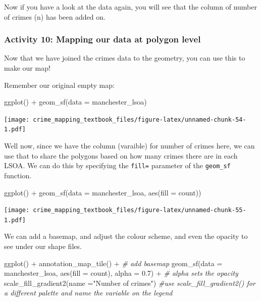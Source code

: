 \documentclass[
]{book}
\newenvironment{Shaded}{\begin{snugshade}}{\end{snugshade}}
\newcommand{\AttributeTok}[1]{\textcolor[rgb]{0.77,0.63,0.00}{#1}}
\newcommand{\CommentTok}[1]{\textcolor[rgb]{0.56,0.35,0.01}{\textit{#1}}}
\newcommand{\FloatTok}[1]{\textcolor[rgb]{0.00,0.00,0.81}{#1}}
\newcommand{\FunctionTok}[1]{\textcolor[rgb]{0.00,0.00,0.00}{#1}}
\newcommand{\NormalTok}[1]{#1}
\newcommand{\SpecialCharTok}[1]{\textcolor[rgb]{0.00,0.00,0.00}{#1}}
\newcommand{\StringTok}[1]{\textcolor[rgb]{0.31,0.60,0.02}{#1}}
\begin{document}
Now if you have a look at the data again, you will see that the column of number of crimes (n) has been added on.

\hypertarget{activity-10-mapping-our-data-at-polygon-level}{%
\subsubsection{Activity 10: Mapping our data at polygon level}\label{activity-10-mapping-our-data-at-polygon-level}}

Now that we have joined the crimes data to the geometry, you can use this to make our map!

Remember our original empty map:

\begin{Shaded}
\begin{Highlighting}[]
\FunctionTok{ggplot}\NormalTok{() }\SpecialCharTok{+} 
\FunctionTok{geom\_sf}\NormalTok{(}\AttributeTok{data =}\NormalTok{ manchester\_lsoa)}
\end{Highlighting}
\end{Shaded}

\texttt{[image: crime\_mapping\_textbook\_files/figure-latex/unnamed-chunk-54-1.pdf]}

Well now, since we have the column (varaible) for number of crimes here, we can use that to share the polygons based on how many crimes there are in each LSOA. We can do this by specifying the \texttt{fill=} parameter of the \texttt{geom\_sf} function.

\begin{Shaded}
\begin{Highlighting}[]
\FunctionTok{ggplot}\NormalTok{() }\SpecialCharTok{+} 
\FunctionTok{geom\_sf}\NormalTok{(}\AttributeTok{data =}\NormalTok{ manchester\_lsoa, }\FunctionTok{aes}\NormalTok{(}\AttributeTok{fill =}\NormalTok{ count))}
\end{Highlighting}
\end{Shaded}

\texttt{[image: crime\_mapping\_textbook\_files/figure-latex/unnamed-chunk-55-1.pdf]}

We can add a basemap, and adjust the colour scheme, and even the opacity to see under our shape files.

\begin{Shaded}
\begin{Highlighting}[]
\FunctionTok{ggplot}\NormalTok{() }\SpecialCharTok{+} 
  \FunctionTok{annotation\_map\_tile}\NormalTok{() }\SpecialCharTok{+}  \CommentTok{\# add basemap}
\FunctionTok{geom\_sf}\NormalTok{(}\AttributeTok{data =}\NormalTok{ manchester\_lsoa, }\FunctionTok{aes}\NormalTok{(}\AttributeTok{fill =}\NormalTok{ count), }\AttributeTok{alpha =} \FloatTok{0.7}\NormalTok{) }\SpecialCharTok{+} \CommentTok{\# alpha sets the opacity}
  \FunctionTok{scale\_fill\_gradient2}\NormalTok{(}\AttributeTok{name =}\StringTok{"Number of crimes"}\NormalTok{) }\CommentTok{\#use scale\_fill\_gradient2() for a different palette and name the variable on the legend}
\end{Highlighting}
\end{Shaded}
\end{document}
